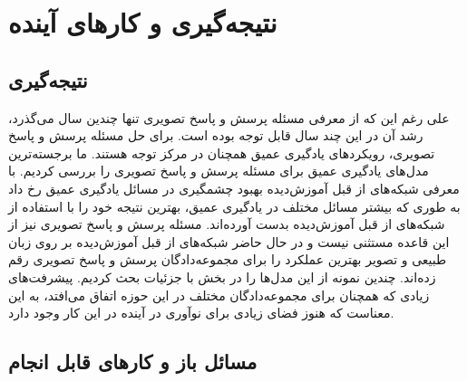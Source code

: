 \chapter{نتیجه‌گیری و کار‌های آینده}
\thispagestyle{empty}

\section{نتیجه‌گیری}
	 علی رغم این که از معرفی مسئله پرسش و پاسخ تصویری تنها چندین سال می‌گذرد، رشد آن در این چند سال قابل توجه‌ بوده است. برای حل مسئله پرسش و پاسخ تصویری، رویکرد‌های یادگیری عمیق همچنان در مرکز توجه هستند. ما برجسته‌ترین مدل‌های یادگیری عمیق برای مسئله پرسش و پاسخ تصویری را بررسی کردیم. با معرفی شبکه‌های از قبل آموزش‌دیده بهبود چشمگیری در مسائل یادگیری عمیق رخ داد به طوری که بیشتر مسائل مختلف در یادگیری عمیق، بهترین نتیجه خود را با استفاده از شبکه‌های از قبل آموزش‌دیده بدست آورده‌اند. مسئله پرسش و پاسخ تصویری نیز از این قاعده مستثنی نیست و در حال حاضر شبکه‌های از قبل آموزش‌دیده بر روی زبان طبیعی و تصویر بهترین عملکرد را برای مجموعه‌دادگان پرسش و پاسخ تصویری رقم زده‌اند. چندین نمونه از این مدل‌ها را در بخش با جزئیات بحث کردیم. پیشرفت‌های زیادی که همچنان برای مجموعه‌دادگان مختلف در این حوزه اتفاق می‌افتد، به این معناست که هنوز فضای زیادی برای نوآوری در آینده در این کار وجود دارد.
\section{مسائل باز و کارهای قابل انجام}

